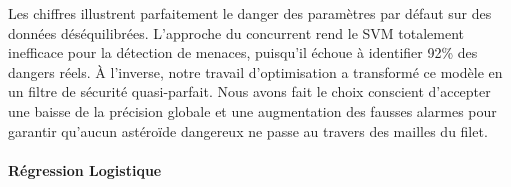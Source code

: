 \documentclass[11pt]{article}
\begin{document}
Les chiffres illustrent parfaitement le danger des paramètres par défaut
sur des données déséquilibrées. L'approche du concurrent rend le SVM
totalement inefficace pour la détection de menaces, puisqu'il échoue à
identifier 92\% des dangers réels. À l'inverse, notre travail
d'optimisation a transformé ce modèle en un filtre de sécurité
quasi-parfait. Nous avons fait le choix conscient d'accepter une baisse
de la précision globale et une augmentation des fausses alarmes pour
garantir qu'aucun astéroïde dangereux ne passe au travers des mailles du
filet.

\paragraph{Régression Logistique}\label{ruxe9gression-logistique}
\end{document}
